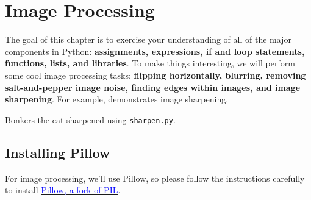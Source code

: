 \chapter{Image Processing}

\setcounter{problem}{1}

\noindent The goal of this chapter is to exercise your understanding of all of the major components in Python: {\bf assignments, expressions, if and loop statements, functions, lists, and libraries}. To make things interesting, we will perform some cool image processing tasks: {\bf flipping horizontally, blurring, removing salt-and-pepper image noise, finding edges within images, and image sharpening}.  For example,  demonstrates image sharpening.

\begin{marginfigure}
\begin{center}
\end{center}
\caption{Bonkers the cat sharpened using {\tt sharpen.py}.}
\label{sharpbonkers}
\end{marginfigure}

\section{Installing Pillow}

For image processing, we'll use Pillow, so please follow the instructions carefully to install \href{http://pillow.readthedocs.org/en/latest/installation.html}{\textcolor{blue}{Pillow, a fork of PIL}}.


